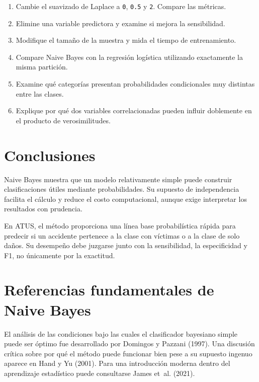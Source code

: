 \documentclass[
  spanish,
  10.5pt,
  letterpaper,
  openany,
  headings=big]{scrbook}
\providecommand{\tightlist}{%
  \setlength{\itemsep}{0pt}\setlength{\parskip}{0pt}}
\begin{document}
\begin{enumerate}
\def\labelenumi{\arabic{enumi}.}
\tightlist
\item
  Cambie el suavizado de Laplace a \texttt{0}, \texttt{0.5} y
  \texttt{2}. Compare las métricas.
\item
  Elimine una variable predictora y examine si mejora la sensibilidad.
\item
  Modifique el tamaño de la muestra y mida el tiempo de entrenamiento.
\item
  Compare Naive Bayes con la regresión logística utilizando exactamente
  la misma partición.
\item
  Examine qué categorías presentan probabilidades condicionales muy
  distintas entre las clases.
\item
  Explique por qué dos variables correlacionadas pueden influir
  doblemente en el producto de verosimilitudes.
\end{enumerate}

\section{Conclusiones}\label{conclusiones-2}

Naive Bayes muestra que un modelo relativamente simple puede construir
clasificaciones útiles mediante probabilidades. Su supuesto de
independencia facilita el cálculo y reduce el costo computacional,
aunque exige interpretar los resultados con prudencia.

En ATUS, el método proporciona una línea base probabilística rápida para
predecir si un accidente pertenece a la clase con víctimas o a la clase
de solo daños. Su desempeño debe juzgarse junto con la sensibilidad, la
especificidad y F1, no únicamente por la exactitud.

\section{Referencias fundamentales de Naive
Bayes}\label{referencias-fundamentales-de-naive-bayes}

El análisis de las condiciones bajo las cuales el clasificador bayesiano
simple puede ser óptimo fue desarrollado por Domingos y Pazzani (1997).
Una discusión crítica sobre por qué el método puede funcionar bien pese
a su supuesto ingenuo aparece en Hand y Yu (2001). Para una introducción
moderna dentro del aprendizaje estadístico puede consultarse James
et~al. (2021).

\cleardoublepage
{}
{}
\appendix
\end{document}
